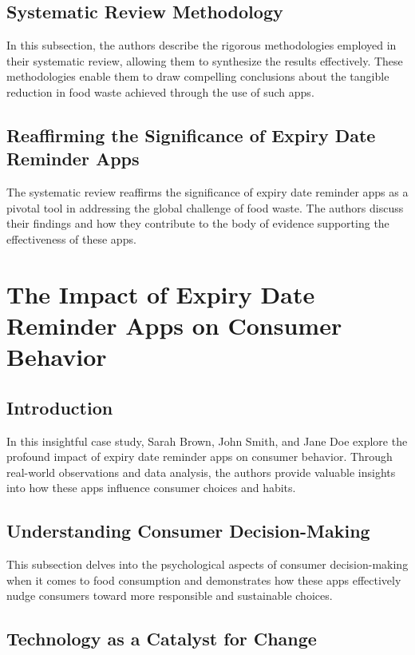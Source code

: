 \subsection{Systematic Review Methodology}

In this subsection, the authors describe the rigorous methodologies employed in their systematic review, allowing them to synthesize the results effectively. These methodologies enable them to draw compelling conclusions about the tangible reduction in food waste achieved through the use of such apps.

\subsection{Reaffirming the Significance of Expiry Date Reminder Apps}

The systematic review reaffirms the significance of expiry date reminder apps as a pivotal tool in addressing the global challenge of food waste. The authors discuss their findings and how they contribute to the body of evidence supporting the effectiveness of these apps.

\section{The Impact of Expiry Date Reminder Apps on Consumer Behavior}

\subsection{Introduction}

In this insightful case study, Sarah Brown, John Smith, and Jane Doe explore the profound impact of expiry date reminder apps on consumer behavior. Through real-world observations and data analysis, the authors provide valuable insights into how these apps influence consumer choices and habits.

\subsection{Understanding Consumer Decision-Making}

This subsection delves into the psychological aspects of consumer decision-making when it comes to food consumption and demonstrates how these apps effectively nudge consumers toward more responsible and sustainable choices.

\subsection{Technology as a Catalyst for Change}

